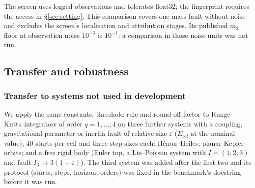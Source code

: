 \documentclass[10pt]{article}
\theoremstyle{definition}
\newcommand{\Eref}{E_{\mathrm{ref}}}
\newcommand{\fittable}[2][\linewidth]{%
  \sbox{\tablebox}{#2}%
  \ifdim\wd\tablebox>#1\relax
    \resizebox{#1}{!}{\usebox{\tablebox}}%
  \else
    \usebox{\tablebox}%
  \fi}
\begin{document}
The screen uses logged observations and tolerates float32; the fingerprint
requires the access in \S\ref{sec:setting}. This comparison covers one mass
fault without noise and excludes the screen's localisation and attribution
stages. Its published $m_2$ floor at observation noise $10^{-3}$ is $10^{-1}$;
a comparison in those noise units was not run.

\subsection{Transfer and robustness}\label{sec:robustness}

\subsubsection{Transfer to systems not used in development}\label{sec:exp:transfer}

We apply the same constants, threshold rule and round-off factor to
Runge--Kutta integrators of order $q=1,\dots,4$
on three further systems with a coupling, gravitational-parameter or inertia
fault of relative size $\varepsilon$ ($\Eref$ at the nominal value), $40$ starts
per cell and three step sizes each:
H\'enon--Heiles; planar Kepler orbits; and a free rigid body (Euler top, a
Lie--Poisson system with $I=(1,2,3)$ and fault $I_3\to3(1+\varepsilon)$). The
third system was added after the first two and its protocol (starts, steps,
horizon, orders) was fixed in the benchmark's docstring before it was run.

\begin{table}[htbp]
\centering\small
\fittable{}
\caption{Same classifier constants on three further systems. Each row pools
$120$ evaluations of $40$ starts at three step sizes. Healthy flagged means
any non-consistent, non-abstaining label. Model rates are descriptive pooled
rates without pooled confidence intervals. The accompanying result files
provide separate per-step rates and $95\%$ Wilson intervals.}
\label{tab:transfer}
\end{table}
\end{document}
